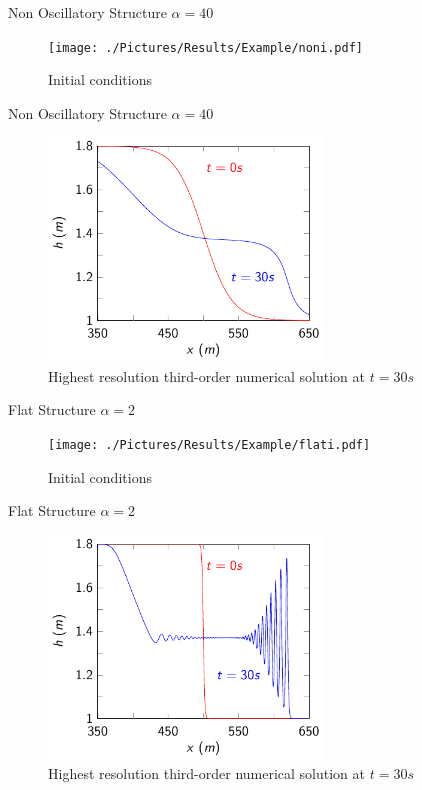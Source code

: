 \documentclass[pdf]{beamer}
\begin{document}
\begin{frame}{Non Oscillatory Structure $\alpha = 40$}
	\begin{figure}
		\texttt{[image: ./Pictures/Results/Example/noni.pdf]}
		\caption{Initial conditions}
	\end{figure}
\end{frame}

\begin{frame}{Non Oscillatory Structure $\alpha = 40$}
		\begin{figure}
			\includegraphics[width=0.65\textwidth]{./Pictures/Results/Example/non.pdf}
			\caption{Highest resolution third-order numerical solution at $t=30s$}
		\end{figure}
\end{frame}

\begin{frame}{Flat Structure $\alpha = 2$}
	\begin{figure}
		\texttt{[image: ./Pictures/Results/Example/flati.pdf]}
		\caption{Initial conditions}
	\end{figure}
\end{frame}

\begin{frame}{Flat Structure $\alpha = 2$}
	\begin{figure}
		\includegraphics[width=0.65\textwidth]{./Pictures/Results/Example/flate.pdf}
		\caption{Highest resolution third-order numerical solution at $t=30s$}
	\end{figure}
\end{frame}
\end{document}
